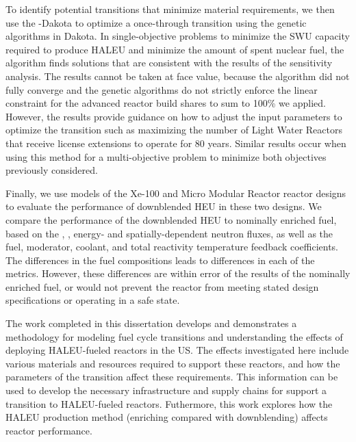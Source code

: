 To identify potential transitions that minimize material requirements,
we then use the \Cyclus-Dakota to optimize a once-through transition
using the genetic algorithms in Dakota. In single-objective problems to 
minimize the \gls{SWU} capacity required to produce \gls{HALEU} and 
minimize the amount of spent nuclear fuel, the algorithm finds 
solutions that are consistent with the results of the 
sensitivity analysis. The results cannot be taken at face 
value, because the algorithm did not fully converge and the genetic 
algorithms do not strictly enforce the 
linear constraint for the advanced reactor build shares to sum to 
100\% we applied. However, the results provide guidance on how to 
adjust the 
input parameters to optimize the transition such as maximizing the 
number of Light Water Reactors that receive license extensions to 
operate for 80 years. Similar results occur when using 
this method for a multi-objective problem to minimize both objectives 
previously considered. 

Finally, we use models of the Xe-100 and Micro Modular Reactor 
reactor designs to 
evaluate the performance of downblended \gls{HEU} in these 
two designs. We compare the performance of the downblended 
\gls{HEU} to nominally enriched fuel, based on the 
\keff, \betaEff, energy- and spatially-dependent neutron 
fluxes, as well as the fuel, moderator, coolant, and total reactivity 
temperature feedback coefficients. The differences in the fuel 
compositions leads to differences in each of the metrics. 
However, these differences are within error of the 
results of the nominally enriched fuel, or would not prevent the 
reactor from meeting stated design specifications or operating 
in a safe state. 

The work completed in this dissertation develops and demonstrates a 
methodology for modeling fuel cycle transitions and  
understanding the effects of deploying \gls{HALEU}-fueled reactors 
in the US. The effects investigated here include various materials and 
resources required to support these reactors, and how the 
parameters of the transition affect these requirements. This 
information can be used to develop the necessary infrastructure 
and supply chains for support a transition to \gls{HALEU}-fueled 
reactors. Futhermore, this work explores how the 
\gls{HALEU} production method (enriching compared with downblending)
affects reactor performance. 
